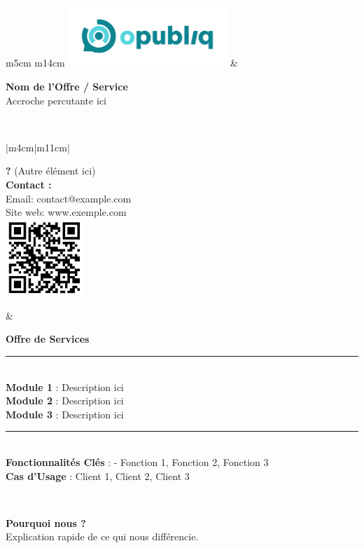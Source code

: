 \documentclass[a4paper,12pt]{article}
\begin{document}
\noindent
\begin{tabular}{ m{5cm} m{14cm} }
    \includegraphics[width=6cm]{images/logo.png} &
    \begin{flushright}
        {\huge \textbf{Nom de l’Offre / Service}} \\[0cm]
        {\large Accroche percutante ici}
    \end{flushright} \hfill \\
\end{tabular}
\vspace{0.5cm}

\noindent
\begin{tabular}{ |m{4cm}|m{11cm}| }
    \hline
    \begin{minipage}[t][15cm]{\linewidth}
        \vspace{0.5cm}
        \textbf{?} (Autre élément ici) \\[1cm]
        \textbf{Contact :} \\[0.5cm]
        Email: contact@example.com \\[0.2cm]
        Site web: www.exemple.com \\[1.5cm]
        \includegraphics[width=3cm]{images/qrcode.png}  %
        \vspace{0.5cm}
    \end{minipage}
    &
    \begin{minipage}[t][10cm]{\linewidth}
        \vspace{0.5cm}
        \textbf{\large Offre de Services} \\[0.3cm]
        \rule{\linewidth}{0.4pt} \\[0.5cm]
        \textbf{Module 1} : Description ici \\[0.3cm]
        \textbf{Module 2} : Description ici \\[0.3cm]
        \textbf{Module 3} : Description ici \\[0.5cm]
        \rule{\linewidth}{0.4pt} \\[0.3cm]
        \textbf{Fonctionnalités Clés} : 
        - Fonction 1, Fonction 2, Fonction 3 \\[0.5cm]
        \textbf{Cas d'Usage} : Client 1, Client 2, Client 3
        \vspace{0.5cm}
    \end{minipage}
    \\ \hline
\end{tabular}
\vspace{0.5cm}

\noindent
\begin{center}
    \textbf{\large Pourquoi nous ?} \\[0.3cm]
    Explication rapide de ce qui nous différencie.
\end{center}
\end{document}
